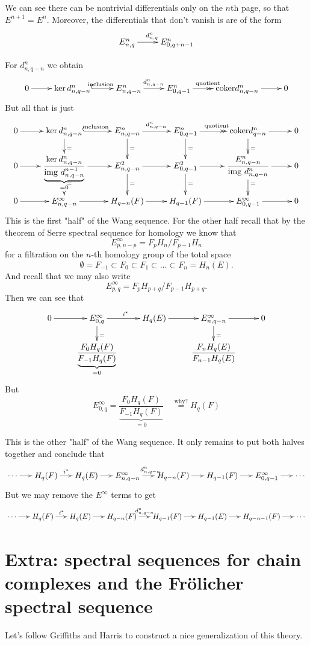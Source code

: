 We can see there can be nontrivial
differentials only on the $n$th page, so that
$E^{n+1}=E^n$. Moreover, the differentials
that don't vanish is are of the form
$$
\xymatrix{
E^n_{n,q}\ar[r]^{d^n_{n,q}}&E^n_{0,q+n-1}
}
$$

For $d_{n,q-n}^n$ we obtain
$$
\xymatrix{
	0\ar[r]&\ker
	d^n_{n,q-n}\ar@{^{(}->}[r]^{\text{inclusion}
	}
	&E^n_{n,q-n}\ar[r]^{d^n_{n,q-n}}
	&E^n_{0,q-1}\ar@{->>}[r]^{\text{quotient}}
	&\text{coker}d^n_{n,q-n}\ar[r]&0
}
$$
But all that is just
$$
\xymatrix@R=1em{
	0\ar[r]&\ker
	d^n_{n,q-n}\ar@{^{(}->}[r]^{\text{inclusion}
	}
	\ar[d]^{=}
	&E^n_{n,q-n}\ar[r]^{d^n_{n,q-n}}\ar[d]^{=}
	&E^n_{0,q-1}\ar@{->>}[r]^{\text{quotient}}
	\ar[d]^{=}
	&\text{coker}d^n_{q-n}\ar[r]\ar[d]^{=}&0\\
	0\ar[r]&\dfrac{\ker
	d^n_{n,q-n}}{\underbrace{\text{img
	}d^{n-1}_{n,q-n}}_{=0}}
	\ar[r]\ar[d]^{=}
	&E^2_{n,q-n}\ar[r]\ar[d]^{=}
	&E^2_{0,q-1}\ar[r]\ar[d]^{=}
	&\dfrac{E^n_{n,q-n}}{\text{img }d^n_{n,q-n}}
	\ar[d]^{=}\ar[r]&0\\
	0\ar[r]&E^\infty_{n,q-n}\ar[r]&H_{q-n}(F)
	\ar[r]
	&H_{q-1}(F)\ar[r]&E^{\infty}_{0,q-1}\ar[r]&0
}
$$
This is the first "half" of the Wang
sequence. For the other half recall that by
the theorem of Serre spectral sequence for
homology we know that
$$E^{\infty}_{p,n-p}=F_pH_n/F_{p-1}H_n$$
for a filtration on the $n$-th homology group
of the total space
$$\emptyset=F_{-1}\subset F_0 \subset
F_1\subset \ldots\subset F_n=H_{n}(E).$$
And recall that we may also write
$$E^\infty_{p,q}=F_pH_{p+q}/F_{p-1}H_{p+q}.$$
Then we can see that
$$
\xymatrix@R=1em{
	0\ar[r]&E^\infty_{0,q}\ar[d]^{=}\ar[r]^{i^*}
	&H_{q}(E)\ar[r]&E^\infty_{n,q-n}\ar[r]\ar[d]
	^{=}
	&0\\
	&\dfrac{F_0H_{q}(F)}{\underbrace{F_{-1}H_{q}
	(F)}_{=0}}
	&&\dfrac{F_nH_{q}(E)}{F_{n-1}H_{q}(E)}
}
$$
But
$$E^\infty_{0,q}=\dfrac{F_0H_{q}(F)}
{\underbrace{F_{-1}H_{q}(F)}_{=0}}\quad
\overset{\text{why?}}{=}H_{q}(F)$$

This is the other "half" of the Wang
sequence. It only remains to put both halves
together and conclude that
$$
\xymatrix@C=1.5em{
	\cdots\ar[r]&H_{q}(F)\ar[r]^{i^*}&H_{q}(E)
	\ar[r]
	&E^{\infty}_{n,q-n}\ar[r]^{d^n_{n,q-n}}
	&H_{q-n}(F)\ar[r]&H_{q-1}(F)\ar[r]
	&E^\infty_{0,q-1}\ar[r]&\cdots
}
$$
But we may remove the $E^\infty$ terms to get
$$
\xymatrix@C=1.5em{
	\cdots\ar[r]&H_{q}(F)\ar[r]^{i^*}&H_{q}(E)
	\ar[r]
	&H_{q-n}(F)\ar[r]^{d^n_{n,q-n}}&H_{q-1}(F)
	\ar[r]
	&H_{q-1}(E)\ar[r]&H_{q-n-1}(F)\ar[r]&\cdots
}
$$

\section{Extra: spectral sequences for chain
complexes and the Fr\"olicher spectral
sequence}
\label{section-extra-spect-seque-chain}
Let's follow Griffiths and Harris to
construct a nice generalization of this
theory.

